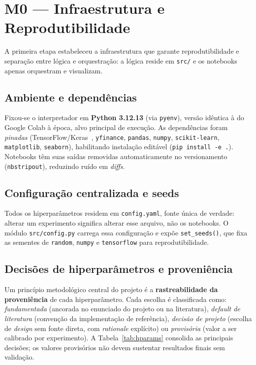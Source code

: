 \section{M0 --- Infraestrutura e Reprodutibilidade}
\label{sec:m0}

A primeira etapa estabeleceu a infraestrutura que garante reprodutibilidade e
separação entre lógica e orquestração: a lógica reside em \texttt{src/} e os notebooks
apenas orquestram e visualizam.

\subsection{Ambiente e dependências}
Fixou-se o interpretador em \textbf{Python 3.12.13} (via \texttt{pyenv}), versão idêntica
à do Google Colab à época, alvo principal de execução. As dependências foram
\emph{pinadas} (TensorFlow/Keras~\cite{tensorflow2015}, \texttt{yfinance}, \texttt{pandas},
\texttt{numpy}, \texttt{scikit-learn}, \texttt{matplotlib}, \texttt{seaborn}), habilitando
instalação editável (\texttt{pip install -e .}). Notebooks têm suas saídas removidas
automaticamente no versionamento (\texttt{nbstripout}), reduzindo ruído em \emph{diffs}.

\subsection{Configuração centralizada e seeds}
Todos os hiperparâmetros residem em \texttt{config.yaml}, fonte única de verdade: alterar
um experimento significa alterar esse arquivo, não os notebooks. O módulo
\texttt{src/config.py} carrega essa configuração e expõe \texttt{set\_seeds()}, que fixa
as sementes de \texttt{random}, \texttt{numpy} e \texttt{tensorflow} para reprodutibilidade.

\subsection{Decisões de hiperparâmetros e proveniência}
Um princípio metodológico central do projeto é a \textbf{rastreabilidade da proveniência}
de cada hiperparâmetro. Cada escolha é classificada como: \emph{fundamentada}
(ancorada no enunciado do projeto ou na literatura), \emph{default de literatura}
(convenção da implementação de referência), \emph{decisão de projeto} (escolha de
\emph{design} sem fonte direta, com \emph{rationale} explícito) ou \emph{provisória}
(valor a ser calibrado por experimento). A Tabela~\ref{tab:hparams} consolida as
principais decisões; os valores provisórios não devem sustentar resultados finais sem
validação.

